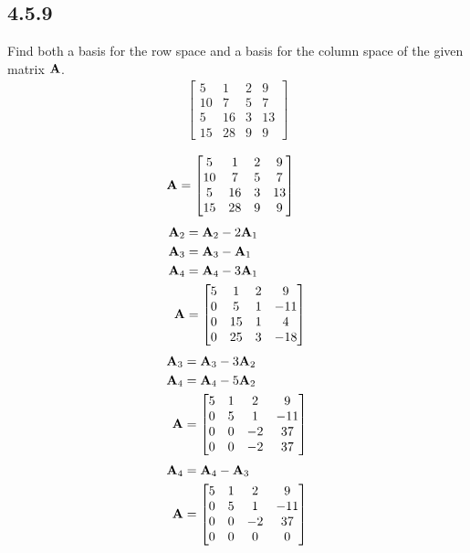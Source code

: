 \documentclass{article}
\begin{document}
\subsection{4.5.9}

Find both a basis for the row space and a basis for the column space of the given matrix $ \mathbf{A} $.
\begin{align*}
	\begin{bmatrix}
		5 & 1 & 2 & 9 \\
		10 & 7 & 5 & 7 \\
		5 & 16 & 3 & 13 \\
		15 & 28 & 9 & 9
	\end{bmatrix}
\end{align*}

\begin{align*}
	\mathbf{A} & =
		\begin{bmatrix}
			5 & 1 & 2 & 9 \\
			10 & 7 & 5 & 7 \\
			5 & 16 & 3 & 13 \\
			15 & 28 & 9 & 9
		\end{bmatrix}
\end{align*}
\begin{align*}
	\mathbf{A}_2 & = \mathbf{A}_2 - 2\mathbf{A}_1 \\
	\mathbf{A}_3 & = \mathbf{A}_3 - \mathbf{A}_1 \\
	\mathbf{A}_4 & = \mathbf{A}_4 - 3\mathbf{A}_1 \\
	\mathbf{A} & =
		\begin{bmatrix}
			5 & 1 & 2 & 9 \\
			0 & 5 & 1 & -11 \\
			0 & 15 & 1 & 4 \\
			0 & 25 & 3 & -18
		\end{bmatrix}
\end{align*}
\begin{align*}
	\mathbf{A}_3 & = \mathbf{A}_3 - 3\mathbf{A}_2 \\
	\mathbf{A}_4 & = \mathbf{A}_4 - 5\mathbf{A}_2 \\
	\mathbf{A} & =
		\begin{bmatrix}
			5 & 1 & 2 & 9 \\
			0 & 5 & 1 & -11 \\
			0 & 0 & -2 & 37 \\
			0 & 0 & -2 & 37
		\end{bmatrix}
\end{align*}
\begin{align*}
	\mathbf{A}_4 & = \mathbf{A}_4 - \mathbf{A}_3 \\
	\mathbf{A} & =
		\begin{bmatrix}
			5 & 1 & 2 & 9 \\
			0 & 5 & 1 & -11 \\
			0 & 0 & -2 & 37 \\
			0 & 0 & 0 & 0
		\end{bmatrix}
\end{align*}
\end{document}
